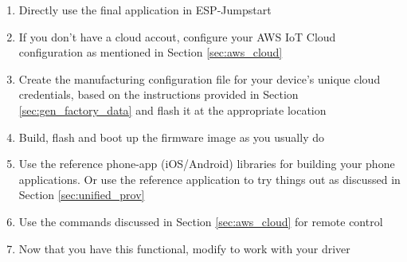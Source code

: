\documentclass[main.tex]{subfiles}
\begin{document}
\begin{enumerate}
    \item Directly use the final application in ESP-Jumpstart
    \item If you don't have a cloud accout, configure your AWS IoT Cloud configuration as mentioned in Section \ref{sec:aws_cloud}
    \item Create the manufacturing configuration file for your device's unique cloud credentials, based on the instructions provided in Section \ref{sec:gen_factory_data} and flash it at the appropriate location
    \item Build, flash and boot up the firmware image as you usually do
    \item Use the reference phone-app (iOS/Android) libraries for building your phone applications. Or use the reference application to try things out as discussed in Section \ref{sec:unified_prov}
    \item Use the commands discussed in Section \ref{sec:aws_cloud} for remote control
    \item Now that you have this functional, modify to work with your driver
\end{enumerate}
\end{document}
